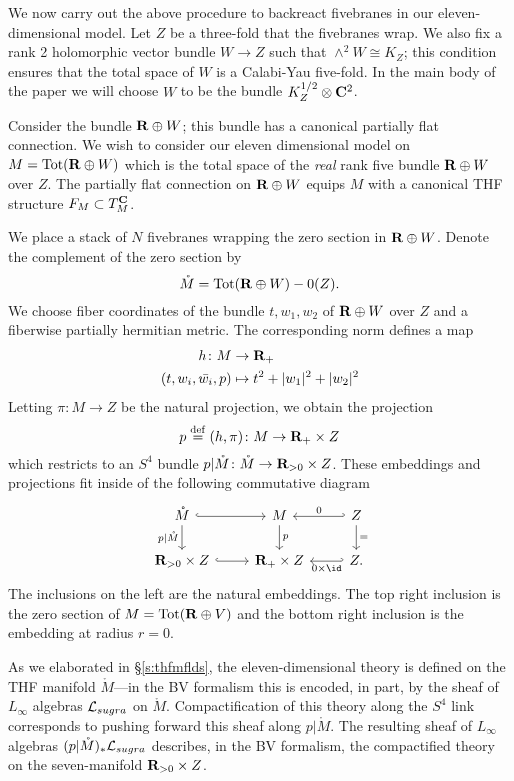 \parsec[s:brfive]

We now carry out the above procedure to backreact fivebranes in our eleven-dimensional model.
Let $Z$ be a three-fold that the fivebranes wrap.
We also fix a rank 2 holomorphic vector bundle $W\to Z$ such that $\wedge^{2} W \cong K_{Z}$;
this condition ensures that the total space of $W$ is a Calabi-Yau five-fold. In the main body of the paper we will choose $W$ to be the bundle $K_{Z}^{1/2}\otimes \mathbf{C}^{2}$.

Consider the bundle $\mathbf{R}\oplus W$; this bundle has a canonical partially flat connection. We wish to consider our eleven dimensional model on $M = \text{Tot} (\mathbf{R}\oplus W)$ which is the total space of the \textit{real} rank five bundle $\mathbf{R}\oplus W$ over $Z$. The partially flat connection on $\mathbf{R}\oplus W$ equips $M$ with a canonical THF structure $F_{M}\subset T_{M}^{\mathbf{C}}$.

We place a stack of $N$ fivebranes wrapping the zero section in $\mathbf{R}\oplus W$.
Denote the complement of the zero section by
\[
\mathring{M} = \text{Tot}(\mathbf{R}\oplus W) - 0(Z).
\]
We choose fiber coordinates of the bundle $t, w_{1}, w_{2}$ of $\mathbf{R} \oplus W$ over $Z$ and a fiberwise partially hermitian metric.
The corresponding norm defines a map
\begin{align*}
 h \colon  M & \to \mathbf{R}_{+} \\
  (t, w_{i}, \bar{w_{i}}, p)& \mapsto t^{2} + |w_{1}|^{2}+|w_{2}|^{2}
\end{align*}
Letting $\pi \colon M \to Z$ be the natural projection, we obtain the projection
\[
p \overset{\rm def}{=} (h,\pi) \colon M \to \mathbf{R}_{+}\times Z
\]
which restricts to an $S^4$ bundle $p|\mathring {M} \colon \mathring{M} \to \mathbf{R}_{>0} \times Z$.
These embeddings and projections fit inside of the following commutative diagram
\[
\begin{tikzcd}
\mathring{M} \ar[d,"p|\mathring M"'] \ar[r,hook] & M \ar[d,"p"] & \ar[l,hook',"0"'] Z \ar[d,"="] \\
\R_{>0} \times Z \ar[r,hook] & \R_{+} \times Z & \ar[l,hook',"0 \times \id"] Z.
\end{tikzcd}
\]
The inclusions on the left are the natural embeddings.
The top right inclusion is the zero section of $M = {\rm Tot}(\mathbf{R} \oplus V)$ and the bottom right inclusion is the embedding at radius $r = 0$.

As we elaborated in \S \ref{s:thfmflds}, the eleven-dimensional theory is defined on the THF manifold $\mathring M$---in the BV formalism this is encoded, in part, by the sheaf of $L_\infty$ algebras $\mathcal L_{sugra}$ on $\mathring M$. Compactification of this theory along the $S^4$ link corresponds to pushing forward this sheaf along $p|\mathring M$. The resulting sheaf of $L_\infty$ algebras $(p|\mathring M)_*\mathcal L_{sugra}$ describes, in the BV formalism, the compactified theory on the seven-manifold $\mathbf{R}_{>0} \times Z$.

